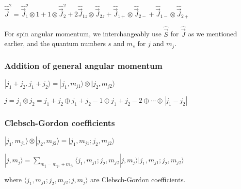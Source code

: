 $\widehat{\vec{J}}^2 = \widehat{\vec{J}}^2_1 \otimes 1 + 1 \otimes \widehat{\vec{J}}_2^2 + 2 \widehat{\vec{J}}_{1z} \otimes \widehat{\vec{J}}_{2z} + \widehat{\vec{J}}_{1+} \otimes \widehat{\vec{J}}_{2-} + \widehat{\vec{J}}_{1-} \otimes \widehat{\vec{J}}_{2+}$

For spin angular momentum, we interchangeably use $\widehat{\vec{S}}$ for $\widehat{\vec{J}}$ as we mentioned earlier, and the quantum numbers $s$ and $m_s$ for $j$ and $m_j$.

\subsubsection{Addition of general angular momentum}

$|j_1 + j_2, j_1 + j_2 \rangle = | j_1, m_{j1} \rangle \otimes |j_2, m_{j2} \rangle$

$j = j_1 \otimes j_2 = j_1 + j_2 \oplus j_1 + j_2 - 1 \oplus j_1 + j_2 - 2 \oplus \cdots \oplus |j_1 - j_2|$

\subsubsection{Clebsch-Gordon coefficients}
$|j_1, m_{j1} \rangle \otimes | j_2, m_{j2} \rangle = |j_1, m_{j1}; j_2, m_{j2} \rangle$

$|j, m_j \rangle = \sum_{m_j = m_{j1} + m_{j2}} \langle j_1, m_{j1}; j_2, m_{j2} | j, m_j \rangle | j_1, m_{j1}; j_2, m_{j2} \rangle$

where $\langle j_1, m_{j1}; j_2, m_{j2}; j, m_j \rangle$ are Clebsch-Gordon coefficients.


